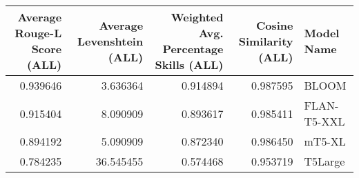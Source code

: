 \begin{tabular}{rrrrl}
\toprule
Average Rouge-L Score (ALL) & Average Levenshtein (ALL) & Weighted Avg. Percentage Skills (ALL) & Cosine Similarity (ALL) & Model Name \\
\midrule
0.939646 & 3.636364 & 0.914894 & 0.987595 & BLOOM \\
0.915404 & 8.090909 & 0.893617 & 0.985411 & FLAN-T5-XXL \\
0.894192 & 5.090909 & 0.872340 & 0.986450 & mT5-XL \\
0.784235 & 36.545455 & 0.574468 & 0.953719 & T5Large \\
\bottomrule
\end{tabular}
